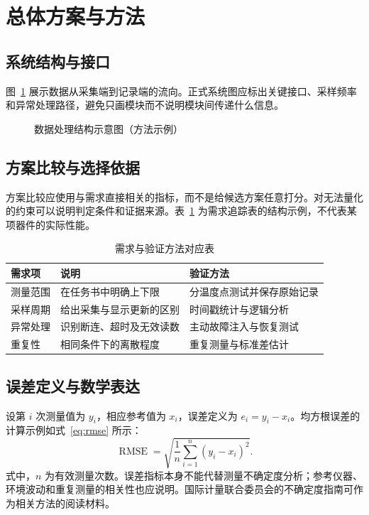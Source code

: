 \section{总体方案与方法}
\subsection{系统结构与接口}
图~\ref{fig:architecture} 展示数据从采集端到记录端的流向。正式系统图应标出关键接口、采样频率和异常处理路径，避免只画模块而不说明模块间传递什么信息。
\begin{figure}[htbp]
\centering
{}
\caption{数据处理结构示意图（方法示例）}\label{fig:architecture}
\end{figure}
\subsection{方案比较与选择依据}
方案比较应使用与需求直接相关的指标，而不是给候选方案任意打分。对无法量化的约束可以说明判定条件和证据来源。表~\ref{tab:requirements} 为需求追踪表的结构示例，不代表某项器件的实际性能。
\begin{table}[htbp]
\centering\caption{需求与验证方法对应表}\label{tab:requirements}
\small
\begin{tabularx}{\linewidth}{lXX}
\toprule 需求项 & 说明 & 验证方法\\\midrule
测量范围 & 在任务书中明确上下限 & 分温度点测试并保存原始记录\\
采样周期 & 给出采集与显示更新的区别 & 时间戳统计与逻辑分析\\
异常处理 & 识别断连、超时及无效读数 & 主动故障注入与恢复测试\\
重复性 & 相同条件下的离散程度 & 重复测量与标准差估计\\\bottomrule
\end{tabularx}
\end{table}
\subsection{误差定义与数学表达}
设第 $i$ 次测量值为 $y_i$，相应参考值为 $x_i$，误差定义为 $e_i=y_i-x_i$。均方根误差的计算示例如式~\eqref{eq:rmse} 所示：
\begin{equation}\label{eq:rmse}
\operatorname{RMSE}=\sqrt{\frac{1}{n}\sum_{i=1}^{n}(y_i-x_i)^2}.
\end{equation}
式中，$n$ 为有效测量次数。误差指标本身不能代替测量不确定度分析；参考仪器、环境波动和重复测量的相关性也应说明。国际计量联合委员会的不确定度指南可作为相关方法的阅读材料\cite{jcgm2008}。

